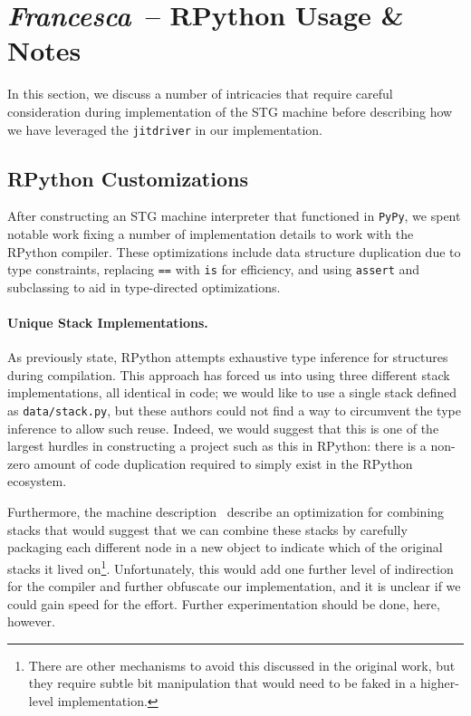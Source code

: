 \documentclass[preprint]{sigplanconf}
\begin{document}
\section{\emph{Francesca}~-- RPython Usage \& Notes} %

In this section, we discuss a number of intricacies that require careful
consideration during implementation of the STG machine before describing
how we have leveraged the \lstinline{jitdriver} in our implementation.

\subsection{RPython Customizations}

After constructing an STG machine interpreter that functioned in
\lstinline{PyPy}, we spent notable work fixing a number of
implementation details to work with the RPython compiler. These
optimizations include data structure duplication due to type
constraints, replacing \lstinline{==} with \lstinline{is}
for efficiency, and using \lstinline{assert} and subclassing
to aid in type-directed optimizations.

\paragraph{Unique Stack Implementations.}\label{sec:typeinf}
As previously state, RPython attempts exhaustive type inference for structures
during compilation. This approach has forced us into using three different
stack implementations, all identical in code; we would like to use a single
stack defined as \lstinline{data/stack.py}, but these authors could not find
a way to circumvent the type inference to allow such reuse.
Indeed, we would suggest that this is one of the largest
hurdles in constructing a project such as this in RPython: there is a non-zero
amount of code duplication required to simply exist in the RPython ecosystem.

Furthermore, the machine description~\cite{spj:stgmachine} describe an
optimization for combining stacks that would suggest that we can combine these
stacks by carefully packaging each different node in a new object to indicate
which of the original stacks it lived on\footnote{There are other mechanisms to
avoid this discussed in the original work, but they require subtle bit
manipulation that would need to be faked in a higher-level implementation.}. 
Unfortunately, this would add one further level of indirection for the compiler
and further obfuscate our implementation, and it is unclear if we could gain
speed for the effort.  Further experimentation should be done, here, however.  
\end{document}
